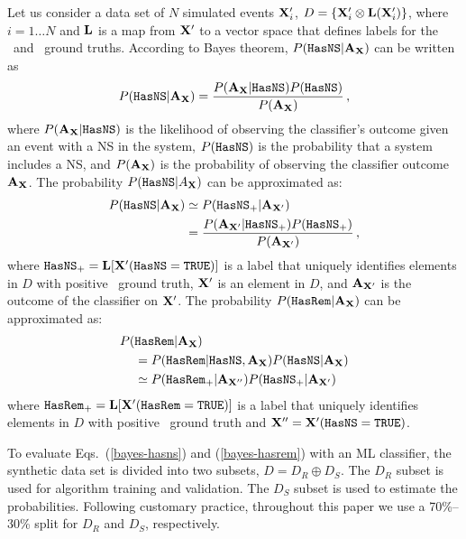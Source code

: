 Let us consider a data set of $N$ simulated events ${\bf X}'_i$, $D=\{{\bf X}'_i\otimes{\bf L}({\bf X}'_i)\}$, where $i=1\dots N$ and ${\bf L}$ is a map from ${\bf X}'$ to a vector space
that defines labels for the \hasns\ and \hasrem\ ground truths. According to Bayes theorem, $P({{\tt HasNS}}|{\bf A}_{\bf X})$  can be written as 
%
\begin{equation}
P({{\tt HasNS}}|{\bf A}_{\bf X})=\frac{P({\bf A}_{\bf X}|{{\tt HasNS}})P({{\tt HasNS}})}{P({\bf A}_{\bf X})}\,,
\label{bayes}
\end{equation}
%
where $P({\bf A}_{\bf X}|{{\tt HasNS}})$ is the likelihood of observing the classifier's outcome given an event with a \ac{NS} in the system, $P({{\tt HasNS}})$ is the probability that a system includes a \ac{NS}, and $P({\bf A}_{\bf X})$ is the probability of observing the classifier outcome ${\bf A}_{\bf X}$. The probability $P({{\tt HasNS}}|A_{\bf X})$ can be approximated as:  
%
\begin{align}
P({{\tt HasNS}}|{\bf A}_{\bf X})&\simeq P({{\tt HasNS}}_+|{\bf A}_{{\bf X}'})\nonumber\\
&=\frac{P({\bf A}_{{\bf X}'}|{{\tt HasNS}}_+)P({{\tt HasNS}}_+)}{P({\bf A}_{{\bf X}'})}\,,
\label{bayes-hasns}
\end{align}
%
where ${{\tt HasNS}}_+={\bf L}[{\bf X}'({{\tt HasNS}}={{\tt TRUE}})]$ is a label that uniquely identifies elements in $D$ with positive \hasns\ ground truth, ${\bf X}'$ is an element in $D$, and ${\bf A}_{{\bf X}'}$ is the outcome of the classifier on ${\bf X}'$. The probability $P({{\tt HasRem}}|{\bf A}_{\bf X})$ can be approximated as:
%
\begin{align}
P(&{{\tt HasRem}}|{\bf A}_{\bf X})\nonumber\\
&=P({{\tt HasRem}}|{{\tt HasNS}}, {\bf A}_{\bf X})P({{\tt HasNS}}|{\bf A}_{\bf X})\nonumber\\
&\simeq P({{\tt HasRem}}_+|{\bf A}_{{\bf X}''})P({{\tt HasNS}}_+|{\bf A}_{{\bf X}'})
\label{bayes-hasrem}
\end{align}
%
where ${{\tt HasRem}}_+={\bf L}[{\bf X}'({{\tt HasRem}}={{\tt TRUE}})]$ is a label that uniquely identifies elements in $D$ with positive \hasrem\ ground truth and ${\bf X}''= {\bf X}'({{\tt HasNS}}={{\tt TRUE}})$.

To evaluate Eqs.~(\ref{bayes-hasns}) and (\ref{bayes-hasrem}) with an \ac{ML} classifier, the synthetic data set is divided into two subsets, $D=D_R\oplus D_S$. The $D_R$ subset is used for
algorithm training and validation. The $D_S$ subset is used to estimate the probabilities. Following customary practice, throughout this paper we use a 70\%--30\% split for $D_R$ and $D_S$,
respectively.


